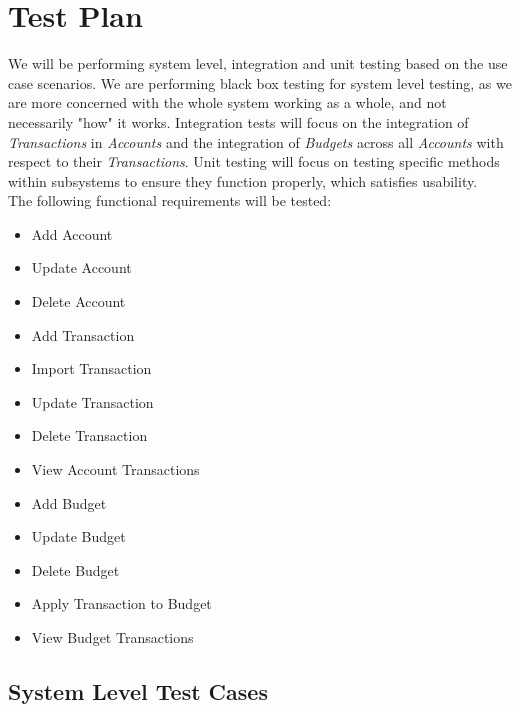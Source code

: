 \documentclass[12pt]{article}
\begin{document}
\section{Test Plan}

We will be performing system level, integration and unit testing based on the use case scenarios.  We are performing black box testing for system level testing, as we are more concerned with the whole system working as a whole, and not necessarily "how" it works. Integration tests will focus on the integration of {\it Transactions} in {\it Accounts} and the integration of {\it Budgets} across all {\it Accounts} with respect to their {\it Transactions}. Unit testing will focus on testing specific methods within subsystems to ensure they function properly, which satisfies usability. \\

The following functional requirements will be tested:
\begin{itemize}
	\item Add Account
	\item Update Account
	\item Delete Account
	\item Add Transaction
	\item Import Transaction
	\item Update Transaction
	\item Delete Transaction
	\item View Account Transactions
	\item Add Budget
	\item Update Budget
	\item Delete Budget
	\item Apply Transaction to Budget
	\item View Budget Transactions
\end{itemize}



\clearpage
\subsection{System Level Test Cases}

\end{document}
